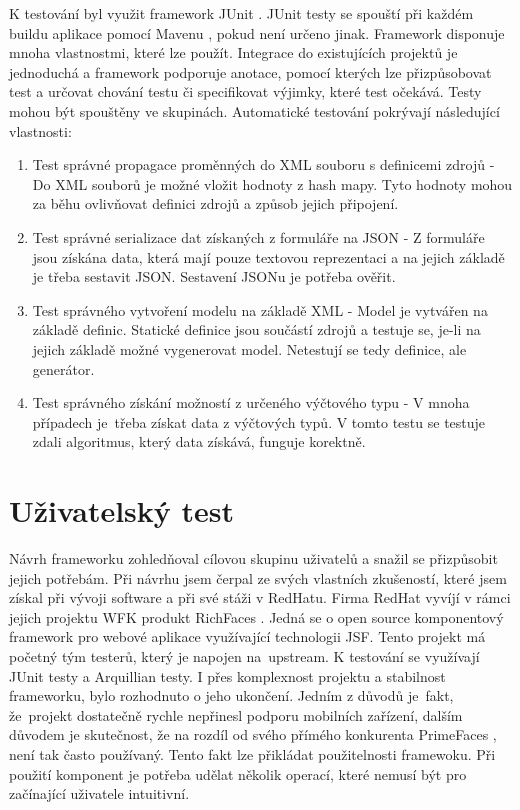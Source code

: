K testování byl využit framework JUnit \cite{junit}. JUnit testy se spouští při každém buildu aplikace pomocí Mavenu \cite{maven}, pokud není určeno jinak. Framework disponuje mnoha vlastnostmi, které lze použít. Integrace do existujících projektů je jednoduchá a framework podporuje anotace, pomocí kterých lze přizpůsobovat test a určovat chování testu či specifikovat výjimky, které test očekává. Testy mohou být spouštěny ve skupinách. Automatické testování pokrývají následující vlastnosti:
\begin{enumerate}
\item Test správné propagace proměnných do XML souboru s definicemi zdrojů - Do XML souborů je možné vložit hodnoty z hash mapy. Tyto hodnoty mohou za běhu ovlivňovat definici zdrojů a způsob jejich připojení. 
\item Test správné serializace dat získaných z formuláře na JSON - Z formuláře jsou získána data, která mají pouze textovou reprezentaci a na jejich základě je třeba sestavit JSON. Sestavení JSONu je potřeba ověřit.
\item Test správného vytvoření modelu na základě XML - Model je vytvářen na základě definic. Statické definice jsou součástí zdrojů a testuje se, je-li na jejich základě možné vygenerovat model. Netestují se tedy definice, ale generátor.
\item Test správného získání možností z určeného výčtového typu - V mnoha případech je~třeba získat data z výčtových typů. V tomto testu se testuje zdali algoritmus, který data získává, funguje korektně.
\end{enumerate}

\section{Uživatelský test}
Návrh frameworku zohledňoval cílovou skupinu uživatelů a snažil se přizpůsobit jejich potřebám. Při návrhu jsem čerpal ze svých vlastních zkušeností, které jsem získal při vývoji software a při své stáži v RedHatu. Firma RedHat vyvíjí v rámci jejich projektu WFK produkt RichFaces \cite{richfaces}. Jedná se o open source komponentový framework pro webové aplikace využívající technologii JSF. Tento projekt má početný tým testerů, který je napojen na~upstream. K testování se využívají JUnit testy a Arquillian testy. I přes komplexnost projektu a stabilnost frameworku, bylo rozhodnuto o jeho ukončení. Jedním z důvodů je~fakt, že~projekt dostatečně rychle nepřinesl podporu mobilních zařízení, dalším důvodem je skutečnost, že na rozdíl od svého přímého konkurenta PrimeFaces \cite{primefaces}, není tak často používaný. Tento fakt lze přikládat použitelnosti framewoku. Při použití komponent je potřeba udělat několik operací, které nemusí být pro začínající uživatele intuitivní. 

